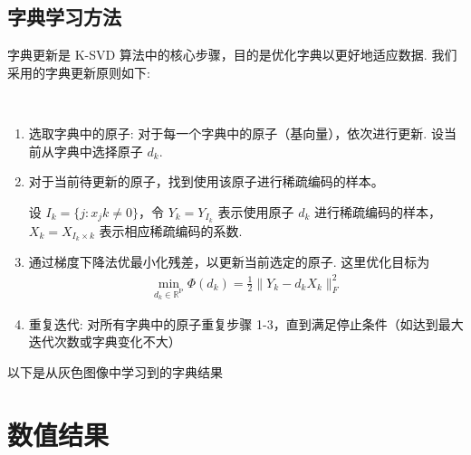 \documentclass[10.5pt]{myarticle}
\begin{document}
\subsection{字典学习方法}
字典更新是 K-SVD 算法中的核心步骤，目的是优化字典以更好地适应数据. 我们采用的字典更新原则如下: 

~

\begin{enumerate}
	\item 选取字典中的原子: 对于每一个字典中的原子（基向量），依次进行更新. 设当前从字典中选择原子 $d_k$. 
	\item 对于当前待更新的原子，找到使用该原子进行稀疏编码的样本。
	
	设 $ I_k = \{ j: x_jk \neq 0 \} $，令 $ Y_k = Y_{I_k} $ 表示使用原子 $d_k$ 进行稀疏编码的样本，$X_k = X_{I_k \times k} $ 表示相应稀疏编码的系数.
	
	\item 通过梯度下降法优最小化残差，以更新当前选定的原子. 这里优化目标为
	\begin{align}
		\min_{d_k \in \mathbb{R}^{\mathrm{P}}} \Phi(d_k) = \frac{1}{2} \| Y_k - d_k X_k \|_F^2
	\end{align}
	
	\item 重复迭代: 对所有字典中的原子重复步骤 1-3，直到满足停止条件（如达到最大迭代次数或字典变化不大）
\end{enumerate}

以下是从灰色图像中学习到的字典结果



\section{数值结果}
\end{document}
